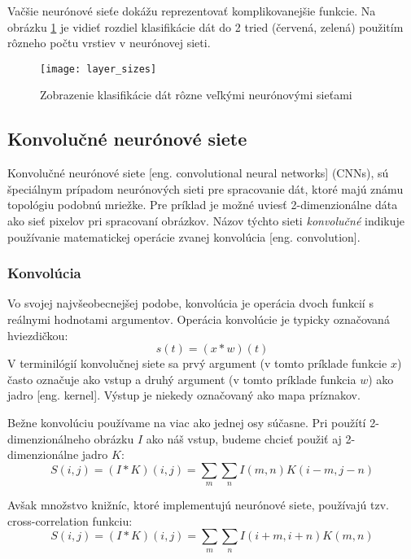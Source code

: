 Vačšie neurónové sieťe dokážu reprezentovať komplikovanejšie funkcie.
Na obrázku \ref{pic:XNNLayerExample} je vidieť rozdiel klasifikácie dát do 2 tried (červená, zelená) použitím rôzneho počtu vrstiev v neurónovej sieti.
\begin{figure}[H]
	\centering
	\texttt{[image: layer\_sizes]}
	\caption{Zobrazenie klasifikácie dát rôzne veľkými neurónovými sieťami \cite{odkaz:ConvolutionalNeuralNetworkCS231n}}
	\label{pic:XNNLayerExample}
\end{figure}

\subsection{Konvolučné neurónové siete}
Konvolučné neurónové siete [eng. convolutional neural networks] (CNNs), sú špeciálnym prípadom neurónových sieti pre spracovanie
    dát, ktoré majú známu topológiu podobnú mriežke.
Pre príklad je možné uviesť 2-dimenzionálne dáta ako sieť pixelov pri spracovaní obrázkov.
Názov týchto sieti \textit{konvolučné} indikuje používanie matematickej operácie zvanej konvolúcia [eng. convolution]\cite{book:Goodfellow-et-al-2016}.

\subsubsection{Konvolúcia}
Vo svojej najvšeobecnejšej podobe, konvolúcia je operácia dvoch funkcií s reálnymi hodnotami argumentov.
Operácia konvolúcie je typicky označovaná hviezdičkou:
\begin{equation}
    s(t) = (x * w)(t)
\end{equation}
V terminilógií konvolučnej siete sa prvý argument (v tomto príklade funkcie $x$) často označuje ako vstup a druhý
    argument (v tomto príklade funkcia $w$) ako jadro [eng. kernel]. Výstup je niekedy označovaný ako mapa príznakov.

Bežne konvolúciu používame na viac ako jednej osy súčasne.
Pri použítí 2-dimenzionálneho obrázku $I$ ako náš vstup, budeme chcieť použiť aj 2-dimenzionálne jadro $K$\cite{book:Goodfellow-et-al-2016}:
\begin{equation}
    S(i,j) = (I * K)(i, j) = \sum_m \sum_n I(m,n) K(i - m, j - n)
\end{equation}

Avšak množstvo knižníc, ktoré implementujú neurónové siete, používajú tzv. cross-correlation funkciu\cite{book:Goodfellow-et-al-2016}:
\begin{equation}
    S(i,j) = (I * K)(i, j) = \sum_m \sum_n I(i + m, i + n) K(m, n)
\end{equation}

